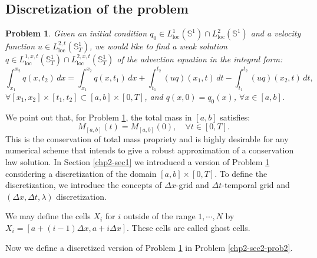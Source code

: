 \subsection{Discretization of the problem}
\theoremstyle{plain} 
\newtheorem{prob}{Problem}[chapter]
\begin{prob}
	\label{chp2-sec2-prob1}
	Given an initial condition ${q}_0\in {L}^{1}_{\text{loc}}(\mathbb{S}^1) \cap {L}^{2}_{\text{loc}}(\mathbb{S}^1)$ and
	a velocity function $u \in {L}^{2,t}_{\text{loc}}(\mathbb{S}^1_{T})$,
	we would like to find a weak solution ${q} \in {L}^{1,x,t}_{\text{loc}}(\mathbb{S}^1_{T}) \cap {L}^{2,x,t}_{\text{loc}}(\mathbb{S}^1_{T})$
	of the advection equation in the integral form:
	\begin{equation*}
	        \int_{x_1}^{x_2} {q}(x, t_2) \,dx = 
       		\int_{x_1}^{x_2} {q}(x, t_1) \,dx + 
        	\int_{t_1}^{t_2} {(uq)}(x_1, t) \,dt -
		\int_{t_1}^{t_2}{(uq)}(x_2, t) \,dt ,
	\end{equation*}
	$\forall [x_1, x_2]\times[t_1, t_2] \subset [a,b] \times [0,T]$, 
	and
	${q}(x,0) = {q}_0(x)$, $\forall x \in [a,b]$.
\end{prob}
We point out that, for Problem \ref{chp2-sec2-prob1}, 
the total mass in $[a,b]$ satisfies: 
\begin{equation}
	{M}_{[a,b]}(t) = {M}_{[a,b]}(0), \quad \forall t \in [0,T].
\end{equation}
This is the conservation of total mass propriety and is highly desirable
for any numerical scheme that intends to give a robust approximation of a
conservation law solution.
In Section \ref{chp2-sec1} we introduced a version of Problem \ref{chp2-sec2-prob1}
considering a discretization of the domain $[a,b] \times [0,T]$. 
To define the discretization, we introduce the concepts of $\Delta x$-grid and $\Delta t$-temporal grid and $(\Delta x, \Delta t, \lambda)$ discretization.
\begin{remark}
	We may define the cells $X_i$ for $i$ outside of the range $1,\cdots, N$ by 
	$X_i = [a+(i-1)\Delta x,a+i\Delta x]$.  These cells are called ghost cells.
\end{remark}
Now we define a discretized version of Problem \ref{chp2-sec2-prob1}  in Problem \ref{chp2-sec2-prob2}.
